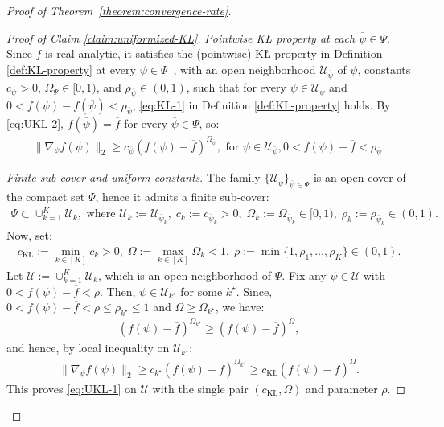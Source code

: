 \documentclass[12pt]{article}
\numberwithin{equation}{section}
\begin{document}
\begin{proof}[Proof of Theorem~\ref{theorem:convergence-rate}]
\begin{proof}[Proof of Claim \ref{claim:uniformized-KL}]
\noindent
\emph{Pointwise K\L{} property at each $\overline{\psi} \in \Psi$}. Since $f$ is real-analytic, it satisfies the (pointwise) K\L{} property in Definition \ref{def:KL-property} at every $\overline{\psi}\in \Psi$~\citep{KL-SIAM-1}, with an open neighborhood $\mathcal{U}_{\overline{\psi}}$ of $\overline{\psi}$, constants $c_{\overline{\psi}} > 0$, $\Omega_{\overline{\Psi}} \in [0, 1)$, and $\rho_{\overline{\psi}} \in (0, 1)$, such that for every $\psi \in \mathcal{U}_{\overline{\psi}}$ and $0< f(\psi) - f(\overline{\psi}) < \rho_{\overline{\psi}}$, \eqref{eq:KL-1} in Definition \ref{def:KL-property} holds. By \eqref{eq:UKL-2}, $f(\overline{\psi}) = \overline{f}$ for every $\overline{\psi} \in \Psi$, so:
\begin{align}\label{eq:UKL-3}
    \lVert \nabla_{\psi} f(\psi)\rVert_{2} \geq c_{\overline{\psi}}\left(f(\psi) - \overline{f}\right)^{\Omega_{\overline{\psi}}},\text{ for $\psi \in \mathcal{U}_{\overline{\psi}}, 0<f(\psi) - \overline{f}<\rho_{\overline{\psi}}$}.
\end{align}

\noindent
\emph{Finite sub-cover and uniform constants}. The family $\{\mathcal{U}_{\overline{\psi}}\}_{\overline{\psi}\in \Psi}$ is an open cover of the compact set $\Psi$, hence it admits a finite sub-cover:
\begin{align}\label{eq:UKL-4}
\Psi \subset \cup_{k=1}^{K}\mathcal{U}_{k},\text{ where }\mathcal{U}_{k}:= \mathcal{U}_{\overline{\psi}_{k}},\; c_{k}:= c_{\overline{\psi}_{k}}>0,\; \Omega_{k}:= \Omega_{\overline{\psi}_{k}}\in [0, 1),\; \rho_{k}:= \rho_{\overline{\psi}_{k}}\in (0, 1).
\end{align}
Now, set:
\begin{align}\label{eq:UKL-5}
c_{\mathrm{K\text{\L}}}:=\min_{k\in[K]} c_{k} > 0,\; \Omega:= \max_{k\in [K]}\Omega_{k} < 1,\; \rho:= \min\{1, \rho_1, \ldots, \rho_K\}\in (0, 1).
\end{align}
Let $\mathcal{U}:= \cup_{k=1}^{K}\mathcal{U}_{k}$, which is an open neighborhood of $\Psi$. Fix any $\psi \in \mathcal{U}$ with $0< f(\psi) - \overline{f} < \rho$. Then, $\psi \in \mathcal{U}_{k^{\star}}$ for some $k^{\star}$. Since, $0<f(\psi) - \overline{f}<\rho\leq \rho_{k^{\star}} \leq 1$ and $\Omega \geq \Omega_{k^{\star}}$, we have:
\begin{align}\label{eq:UKL-6}
    \left(f(\psi) - \overline{f}\right)^{\Omega_{k^{\star}}} \geq \left(f(\psi) - \overline{f}\right)^{\Omega},
\end{align}
and hence, by local inequality on $\mathcal{U}_{k^{\star}}$:
\begin{align}\label{eq:UKL-7}
    \lVert \nabla_{\psi}f(\psi)\rVert_{2} \geq c_{k^{\star}}\left(f(\psi) - \overline{f}\right)^{\Omega_{k^{\star}}} \geq c_{\mathrm{K\text{\L}}}\left(f(\psi) - \overline{f}\right)^{\Omega}.
\end{align}
This proves \eqref{eq:UKL-1} on $\mathcal{U}$ with the single pair $(c_{\mathrm{K\text{\L}}}, \Omega)$ and parameter $\rho$.


\end{proof}
\end{proof}
\end{document}
